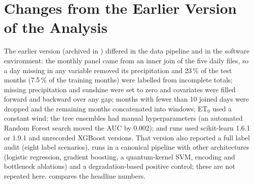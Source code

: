 \documentclass[11pt,a4paper]{article}
\begin{document}
\section{Changes from the Earlier Version of the Analysis}
\label{app:v1}

The earlier version (archived in ) differed in the data pipeline and in the software environment: the monthly panel came from an inner join of the five daily files, so a day missing in any variable removed its precipitation and 23\,\% of the test months (7.5\,\% of the training months) were labelled from incomplete totals; missing precipitation and sunshine were set to zero and covariates were filled forward and backward over any gap; months with fewer than 10 joined days were dropped and the remaining months concatenated into windows; ET$_0$ used a constant wind; the tree ensembles had manual hyperparameters (an automated Random Forest search moved the AUC by 0.002); and runs used scikit-learn 1.6.1 or 1.9.1 and unrecorded XGBoost versions. That version also reported a full label audit (eight label scenarios), runs in a canonical pipeline with other architectures (logistic regression, gradient boosting, a quantum-kernel SVM, encoding and bottleneck ablations) and a degradation-based positive control; these are not repeated here.  compares the headline numbers.
\end{document}
